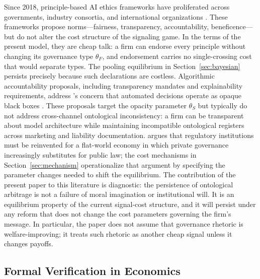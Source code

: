 Since 2018, principle-based AI ethics frameworks have proliferated across governments, industry consortia, and international organizations \citep{floridi2018ai4people,jobin2019global}. These frameworks propose norms---fairness, transparency, accountability, beneficence---but do not alter the cost structure of the signaling game. In the terms of the present model, they are cheap talk: a firm can endorse every principle without changing its governance type $\theta_F$, and endorsement carries no single-crossing cost that would separate types. The pooling equilibrium in Section~\ref{sec:bayesian} persists precisely because such declarations are costless. Algorithmic accountability proposals, including transparency mandates and explainability requirements, address \citeauthor{pasquale2015}'s concern that automated decisions operate as opaque black boxes \citep{pasquale2015}. These proposals target the opacity parameter $\theta_S$ but typically do not address cross-channel ontological inconsistency: a firm can be transparent about model architecture while maintaining incompatible ontological registers across marketing and liability documentation. \citet{hadfield2017rules} argues that regulatory institutions must be reinvented for a flat-world economy in which private governance increasingly substitutes for public law; the cost mechanisms in Section~\ref{sec:mechanism} operationalize that argument by specifying the parameter changes needed to shift the equilibrium. The contribution of the present paper to this literature is diagnostic: the persistence of ontological arbitrage is not a failure of moral imagination or institutional will. It is an equilibrium property of the current signal-cost structure, and it will persist under any reform that does not change the cost parameters governing the firm's message. In particular, the paper does not assume that governance rhetoric is welfare-improving; it treats such rhetoric as another cheap signal unless it changes payoffs.

\subsection{Formal Verification in Economics}

